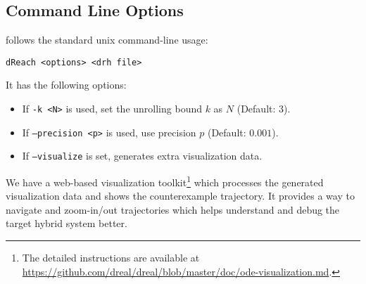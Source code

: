 \subsection{Command Line Options}
\dReach{} follows the standard unix command-line usage:
\begin{Verbatim}[fontfamily=courier, framesep=1mm, fontsize=\small]
dReach <options> <drh file>
\end{Verbatim}
It has the following options:
\begin{itemize}
\item If \texttt{-k <N>} is used, set the unrolling bound $k$ as $N$ (Default: 3).
\item If \texttt{--precision <p>} is used, use precision $p$ (Default: $0.001$).
\item If \texttt{--visualize} is set, \dReach{} generates extra visualization data.
\end{itemize}
We have a web-based visualization toolkit\footnote{The detailed
  instructions are available at
  \url{https://github.com/dreal/dreal/blob/master/doc/ode-visualization.md}.}
which processes the generated visualization data and shows the
counterexample trajectory. It provides a way to navigate and
zoom-in/out trajectories which helps understand and debug the target
hybrid system better.

